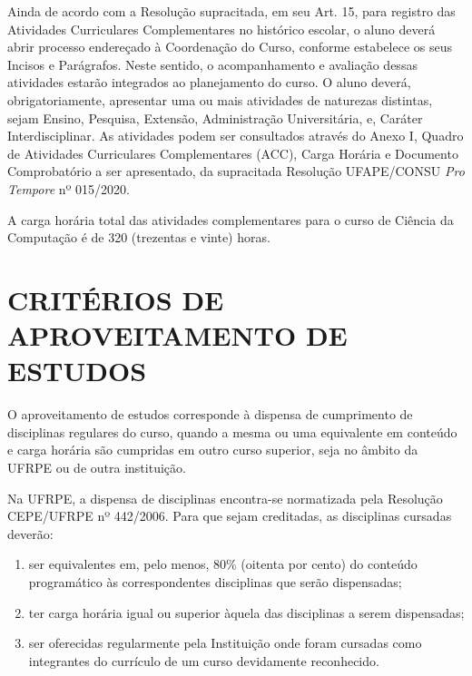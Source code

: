 \documentclass[
	12pt,				%
	openright,			%
  oneside,     %
	a4paper,			%
	chapter=TITLE,		%
	english,			%
	french,				%
	spanish,			%
	brazil				%
	]{abntex2}
\begin{document}
Ainda de acordo com a Resolução supracitada, em seu Art. 15, para registro das Atividades Curriculares Complementares no histórico escolar, o aluno deverá abrir processo endereçado à Coordenação do Curso, conforme estabelece os seus Incisos e Parágrafos. Neste sentido, o acompanhamento e avaliação dessas atividades estarão integrados ao planejamento do curso. O aluno deverá, obrigatoriamente, apresentar uma ou mais atividades de naturezas distintas, sejam Ensino, Pesquisa, Extensão, Administração Universitária, e, Caráter Interdisciplinar. As atividades podem ser consultados através do Anexo I, Quadro de Atividades Curriculares Complementares (ACC), Carga Horária e Documento Comprobatório a ser apresentado, da supracitada Resolução UFAPE/CONSU \textit{Pro Tempore} nº 015/2020.

A carga horária total das atividades complementares para o curso de Ciência da Computação é de 320 (trezentas e vinte) horas.



%
%


\chapter{CRITÉRIOS DE APROVEITAMENTO DE ESTUDOS}

O aproveitamento de estudos corresponde à dispensa de cumprimento de disciplinas regulares do curso, quando a mesma ou uma equivalente em conteúdo e carga horária são cumpridas em outro curso superior, seja no âmbito da UFRPE ou de outra instituição.

Na UFRPE, a dispensa de disciplinas encontra-se normatizada pela Resolução CEPE/UFRPE nº 442/2006. Para que sejam creditadas, as disciplinas cursadas deverão:

\begin{enumerate}[label=(\alph*)]
  \item ser equivalentes em, pelo menos, 80\% (oitenta por cento) do conteúdo programático às correspondentes disciplinas que serão dispensadas; 	
  \item ter carga horária igual ou superior àquela das disciplinas a serem dispensadas; 	
  \item ser oferecidas regularmente pela Instituição onde foram cursadas como integrantes do currículo de um curso devidamente reconhecido.
\end{enumerate}
\end{document}

